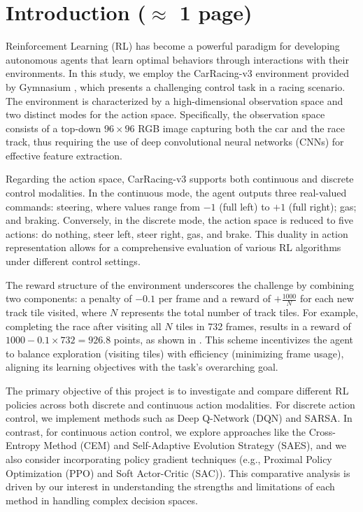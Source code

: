\documentclass[../CSC_52081_EP.tex]{subfiles}
\begin{document}
    \section{Introduction ($\approx$ 1 page)}
    \label{sec:intro}

Reinforcement Learning (RL) has become a powerful paradigm for developing autonomous agents that learn optimal behaviors through interactions with their environments. In this study, we employ the CarRacing-v3 environment provided by Gymnasium \cite{gymnasium}, which presents a challenging control task in a racing scenario. The environment is characterized by a high-dimensional observation space and two distinct modes for the action space. Specifically, the observation space consists of a top-down \(96\times96\) RGB image capturing both the car and the race track, thus requiring the use of deep convolutional neural networks (CNNs) for effective feature extraction.

Regarding the action space, CarRacing-v3 supports both continuous and discrete control modalities. In the continuous mode, the agent outputs three real-valued commands: steering, where values range from \(-1\) (full left) to \(+1\) (full right); gas; and braking. Conversely, in the discrete mode, the action space is reduced to five actions: do nothing, steer left, steer right, gas, and brake. This duality in action representation allows for a comprehensive evaluation of various RL algorithms under different control settings.

The reward structure of the environment underscores the challenge by combining two components: a penalty of \(-0.1\) per frame and a reward of \(+\frac{1000}{N}\) for each new track tile visited, where \(N\) represents the total number of track tiles. For example, completing the race after visiting all \(N\) tiles in 732 frames, results in a reward of \(1000 - 0.1 \times 732 = 926.8\) points, as shown in \cite{gymnasium}. This scheme incentivizes the agent to balance exploration (visiting tiles) with efficiency (minimizing frame usage), aligning its learning objectives with the task's overarching goal.

The primary objective of this project is to investigate and compare different RL policies across both discrete and continuous action modalities. For discrete action control, we implement methods such as Deep Q-Network (DQN) and SARSA. In contrast, for continuous action control, we explore approaches like the Cross-Entropy Method (CEM) and Self-Adaptive Evolution Strategy (SAES), and we also consider incorporating policy gradient techniques (e.g., Proximal Policy Optimization (PPO) and Soft Actor-Critic (SAC)). This comparative analysis is driven by our interest in understanding the strengths and limitations of each method in handling complex decision spaces.
\end{document}
